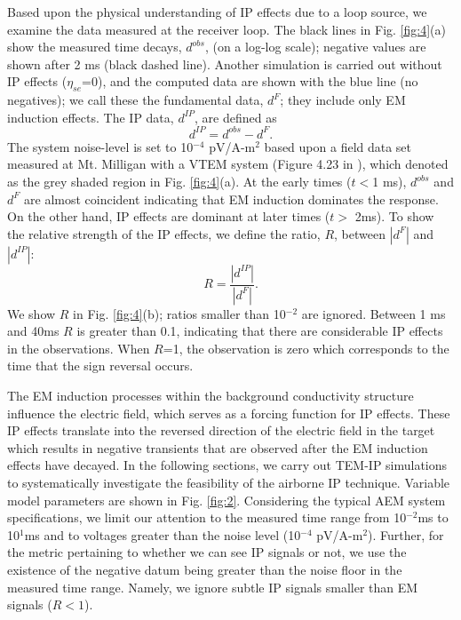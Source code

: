 \documentclass[manuscript]{geophysics}
\newcommand{\dip}{d^{IP}}
\begin{document}
Based upon the physical understanding of IP effects due to a loop source, we examine  the data measured  at the receiver loop.
The black lines in Fig. \ref{fig:4}(a) show the measured time decays, $d^{obs}$, (on a log-log scale); negative values are shown after 2 ms (black dashed line). Another simulation is carried out without IP effects ($\eta_{se}$=0), and the computed data are shown with the blue line (no negatives); we call these the fundamental data, $d^F$; they include only EM induction effects. The IP data, $\dip$, are defined as
\begin{equation}
    \dip = d^{obs} - d^F.
\end{equation}
The system noise-level is set to 10$^{-4}$ pV/A-m$^2$ based upon a field data set measured at Mt. Milligan with a VTEM system (Figure 4.23 in \cite{Kang_2018}), which denoted as the grey shaded region in Fig. \ref{fig:4}(a). At the early times ($t<$1 ms), $d^{obs}$ and $d^{F}$ are almost coincident indicating that EM induction dominates the response. On the other hand, IP effects are dominant at later times ($t>$ 2ms). To show the relative strength of the IP effects, we define the ratio, $R$, between $|d^F|$ and $|\dip|$:
\begin{equation}
    R = \frac{|\dip|}{|d^F|}.
\end{equation}
We show $R$ in Fig. \ref{fig:4}(b); ratios smaller than 10$^{-2}$ are ignored. Between 1 ms and 40ms $R$ is greater than 0.1, indicating that there are considerable IP effects in the observations. When $R$=1, the observation is zero which corresponds to the time that the sign reversal occurs.

The EM induction processes within the background conductivity structure influence the electric field, which serves as a forcing function for IP effects. These IP effects translate into the reversed direction of the electric field in the target which results in negative transients that are observed after the EM induction effects have decayed. In the following sections, we carry out TEM-IP simulations  to systematically investigate the feasibility of the airborne IP technique. Variable model parameters are shown in Fig. \ref{fig:2}. Considering the typical  AEM system specifications, we limit our attention to the measured time range from 10$^{-2}$ms to 10$^{1}$ms and to voltages greater than the noise level (10$^{-4}$ pV/A-m$^2$). Further, for the metric pertaining to whether we can see IP signals or not, we use the existence of the negative datum being greater than the noise floor in the measured time range. Namely, we ignore subtle IP signals smaller than EM signals ($R<1$).
\end{document}
